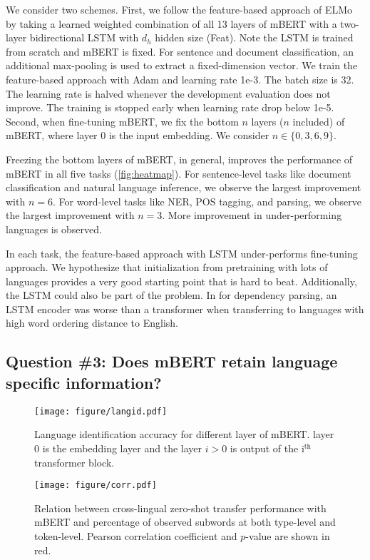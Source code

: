 \documentclass[11pt,a4paper]{article}
\begin{document}
We consider two schemes. First, we follow the feature-based approach of ELMo by taking a learned weighted combination of all 13 layers of mBERT with a two-layer bidirectional LSTM with $d_h$ hidden size (Feat). Note the LSTM is trained from scratch and mBERT is fixed. For sentence and document classification, an additional max-pooling is used to extract a fixed-dimension vector. We train the feature-based approach with Adam and learning rate 1e-3. The batch size is 32. The learning rate is halved whenever the development evaluation does not improve. The training is stopped early when learning rate drop below 1e-5. Second, when fine-tuning mBERT, we fix the bottom $n$ layers ($n$ included) of mBERT, where layer 0 is the input embedding. We consider $n \in \{0, 3, 6, 9\}$.

Freezing the bottom layers of mBERT, in general, improves the performance of mBERT in all five tasks (\cref{fig:heatmap}). For sentence-level tasks like document classification and natural language inference, we observe the largest improvement with $n = 6$. For word-level tasks like NER, POS tagging, and parsing, we observe the largest improvement with $n = 3$. More improvement in under-performing languages is observed.

In each task, the feature-based approach with LSTM under-performs fine-tuning approach. We hypothesize that
initialization from pretraining with lots of languages provides a very good starting point that is hard to beat. Additionally, the LSTM could also be part of the problem. In \citet{ahmad-etal-2019-difficulties} for dependency parsing, an LSTM encoder was worse than a transformer when transferring to languages with high word ordering distance to English.

\subsection{Question \#3: Does mBERT retain language specific information?}\label{sec:exp3}

\begin{figure}[t]
\centering
\texttt{[image: figure/langid.pdf]}
\caption{Language identification accuracy for different layer of mBERT. layer 0 is the embedding layer and the layer $i > 0$ is output of the i$^\text{th}$ transformer block.}
\label{fig:langid}
\end{figure}

\begin{figure*}[h!]
\centering
\texttt{[image: figure/corr.pdf]}
\caption{Relation between cross-lingual zero-shot transfer performance with mBERT and percentage of observed subwords at both type-level and token-level. Pearson correlation coefficient and $p$-value are shown in red.}\label{fig:corr}
\end{figure*}
\end{document}
